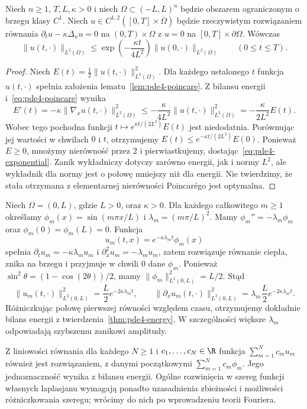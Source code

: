 \begin{wniosek}
\label{cor:pde4-exponential}
Niech $n\geq1$, $T,L,\kappa>0$ i niech
$\Omega\subset(-L,L)^n$ będzie obszarem ograniczonym
o brzegu klasy $C^1$.
Niech $u\in C^{1,2}([0,T]\times\overline\Omega)$
będzie rzeczywistym rozwiązaniem równania
$\partial_tu-\kappa\Delta_xu=0$ na $(0,T)\times\Omega$
z $u=0$ na $[0,T]\times\partial\Omega$.
Wówczas
\begin{equation}\label{eq:pde4-exponential}
 \|u(t,\cdot)\|_{L^2(\Omega)}\leq
 \exp\!\left(-\frac{\kappa t}{4L^2}\right)
 \|u(0,\cdot)\|_{L^2(\Omega)}\qquad(0\leq t\leq T).
\end{equation}
\end{wniosek}
\begin{proof}
Niech $E(t)=\frac12\|u(t,\cdot)\|_{L^2(\Omega)}^2$.
Dla każdego ustalonego $t$ funkcja $u(t,\cdot)$
spełnia założenia lematu~\ref{lem:pde4-poincare}.
Z bilansu energii i~\eqref{eq:pde4-poincare} wynika
\[
 E'(t)=-\kappa\|\nabla_xu(t,\cdot)\|_{L^2(\Omega)}^2
 \leq-\frac{\kappa}{4L^2}\|u(t,\cdot)\|_{L^2(\Omega)}^2
 =-\frac{\kappa}{2L^2}E(t).
\]
Wobec tego pochodna funkcji
$t\mapsto e^{\kappa t/(2L^2)}E(t)$ jest niedodatnia.
Porównując jej wartości w chwilach $0$ i $t$,
otrzymujemy $E(t)\leq e^{-\kappa t/(2L^2)}E(0)$.
Ponieważ $E\geq0$, mnożymy nierówność przez $2$
i pierwiastkujemy, dostając~\eqref{eq:pde4-exponential}.
Zanik wykładniczy dotyczy zarówno energii, jak
i normy $L^2$, ale wykładnik dla normy jest o połowę
mniejszy niż dla energii. Nie twierdzimy,
że stała otrzymana z elementarnej nierówności
Poincarégo jest optymalna.
\end{proof}

\begin{przyklad}
Niech $\Omega=(0,L)$, gdzie $L>0$, oraz $\kappa>0$.
Dla każdego całkowitego $m\geq1$ określamy
$\phi_m(x)=\sin(m\pi x/L)$ i $\lambda_m=(m\pi/L)^2$.
Mamy $\phi_m''=-\lambda_m\phi_m$ oraz
$\phi_m(0)=\phi_m(L)=0$.
Funkcja
\[
 u_m(t,x)=e^{-\kappa\lambda_m t}\phi_m(x)
\]
spełnia $\partial_tu_m=-\kappa\lambda_m u_m$
i $\partial_x^2u_m=-\lambda_m u_m$, zatem
rozwiązuje równanie ciepła, znika na brzegu
i przyjmuje w chwili $0$ dane $\phi_m$.
Ponieważ $\sin^2\theta=(1-\cos(2\theta))/2$,
mamy $\|\phi_m\|_{L^2(0,L)}^2=L/2$.
Stąd
\[
 \|u_m(t,\cdot)\|_{L^2(0,L)}^2
 =\frac L2 e^{-2\kappa\lambda_m t},\qquad
 \|\partial_xu_m(t,\cdot)\|_{L^2(0,L)}^2
 =\lambda_m\frac L2 e^{-2\kappa\lambda_m t}.
\]
Różniczkując połowę pierwszej równości względem
czasu, otrzymujemy dokładnie bilans energii
z twierdzenia~\ref{thm:pde4-energy}.
W szczególności większe $\lambda_m$ odpowiadają
szybszemu zanikowi amplitudy.

Z liniowości równania dla każdego $N\geq1$
i $c_1,\ldots,c_N\in\R$ funkcja
$\sum_{m=1}^N c_m u_m$ również jest rozwiązaniem,
z danymi początkowymi $\sum_{m=1}^N c_m\phi_m$.
Jego jednoznaczność wynika z bilansu energii.
Ogólne rozwinięcia w szereg funkcji własnych
laplasjanu wymagają ponadto uzasadnienia
zbieżności i możliwości różniczkowania szeregu;
wrócimy do nich po wprowadzeniu teorii Fouriera.
\end{przyklad}


